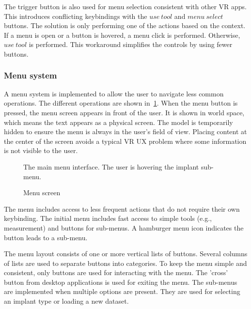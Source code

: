 \documentclass[a4paper]{report}
\begin{document}
The trigger button is also used for menu selection consistent with other VR apps. This introduces conflicting keybindings with the $use\ tool$ and $menu\ select$ buttons. The solution is only performing one of the actions based on the context. If a menu is open or a button is hovered, a menu click is performed. Otherwise, $use\ tool$ is performed. This workaround simplifies the controls by using fewer buttons.

\subsubsection{Menu system}
A menu system is implemented to allow the user to navigate less common operations. The different operations are shown in~\ref{menu}.
When the menu button is pressed, the menu screen appears in front of the user. It is shown in world space, which means the text appears as a physical screen. The model is temporarily hidden to ensure the menu is always in the user's field of view. Placing content at the center of the screen avoids a typical VR UX problem where some information is not visible to the user.

\begin{figure}[h!]
    \centering
	\hfill
	\caption{Menu screen}\label{menu}
  \small
  The main menu interface. The user is hovering the implant sub-menu.
\end{figure}

The menu includes access to less frequent actions that do not require their own keybinding. The initial menu includes fast access to simple tools (e.g., measurement) and buttons for sub-menus. A hamburger menu icon indicates the button leads to a sub-menu.

The menu layout consists of one or more vertical lists of buttons. Several columns of lists are used to separate buttons into categories. To keep the menu simple and consistent, only buttons are used for interacting with the menu. The 'cross' button from desktop applications is used for exiting the menu.
The sub-menus are implemented when multiple options are present. They are used for selecting an implant type or loading a new dataset.
\end{document}
